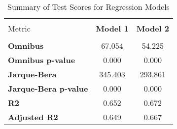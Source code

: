
    \begin{table}
        \centering
        \caption{Summary of Test Scores for Regression Models}
        \vspace{10pt}
        \label{tab:test_scores}
        \begin{tabular}{lcc}
        \hline
        \hline \\[-1.8ex]
    Metric & \textbf{Model 1} & \textbf{Model 2} \\
\hline \\[-1.8ex] 
\textbf{Omnibus} & 67.054 & 54.225 \\
\textbf{Omnibus p-value} & 0.000 & 0.000 \\
\textbf{Jarque-Bera} & 345.403 & 293.861 \\
\textbf{Jarque-Bera p-value} & 0.000 & 0.000 \\
\textbf{R2} & 0.652 & 0.672 \\
\textbf{Adjusted R2} & 0.649 & 0.667 \\

        \hline
        \hline
        \end{tabular}
    \end{table}
    